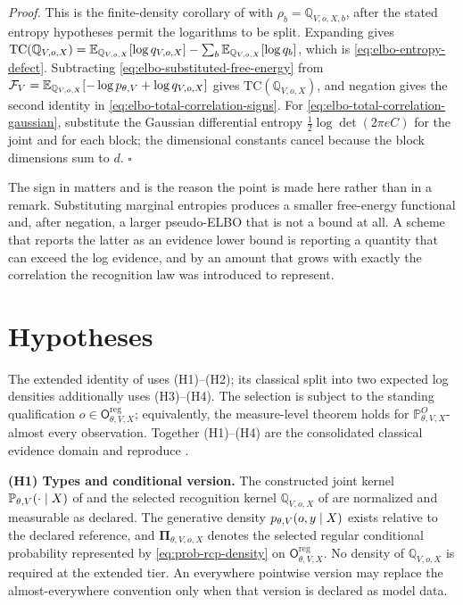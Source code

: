 \emph{Proof.} This is the finite-density corollary of  with $\rho_b=\mathbb Q_{V,o,X,b}$, after the stated entropy hypotheses permit the logarithms to be split. Expanding gives \(\mathrm{TC}(\mathbb Q_{V,o,X})=\mathbb E_{\mathbb Q_{V,o,X}}[\log q_{V,o,X}]-\sum_b\mathbb E_{\mathbb Q_{V,o,X}}[\log q_b]\), which is \eqref{eq:elbo-entropy-defect}. Subtracting \eqref{eq:elbo-substituted-free-energy} from \(\mathcal F_V=\mathbb E_{\mathbb Q_{V,o,X}}[-\log p_{\theta,V}+\log q_{V,o,X}]\) gives \(\mathrm{TC}(\mathbb Q_{V,o,X})\), and negation gives the second identity in \eqref{eq:elbo-total-correlation-signs}. For \eqref{eq:elbo-total-correlation-gaussian}, substitute the Gaussian differential entropy \(\tfrac12\log\det(2\pi e C)\) for the joint and for each block; the dimensional constants cancel because the block dimensions sum to \(d\). \hfill\(\square\)

The sign in  matters and is the reason the point is made here rather than in a remark. Substituting marginal entropies produces a smaller free-energy functional and, after negation, a larger pseudo-ELBO that is not a bound at all. A scheme that reports the latter as an evidence lower bound is reporting a quantity that can exceed the log evidence, and by an amount that grows with exactly the correlation the recognition law was introduced to represent.

\section{Hypotheses}
\label{sec:elbo-hypotheses}

The extended identity of  uses (H1)--(H2); its classical split into two expected log densities additionally uses (H3)--(H4). The selection is subject to the standing qualification \(o\in\mathsf O_{\theta,V,X}^{\mathrm{reg}}\); equivalently, the measure-level theorem holds for \(\mathbb P_{\theta,V,X}^{O}\)-almost every observation. Together (H1)--(H4) are the consolidated classical evidence domain and reproduce . 

\textbf{(H1) Types and conditional version.} The constructed joint kernel \(\mathbb P_{\theta,V}(\cdot\mid X)\) of  and the selected recognition kernel \(\mathbb Q_{V,o,X}\) of  are normalized and measurable as declared. The generative density \(p_{\theta,V}(o,y\mid X)\) exists relative to the declared reference, and \(\boldsymbol\Pi_{\theta,V,o,X}\) denotes the selected regular conditional probability represented by \eqref{eq:prob-rcp-density} on \(\mathsf O_{\theta,V,X}^{\mathrm{reg}}\). No density of \(\mathbb Q_{V,o,X}\) is required at the extended tier. An everywhere pointwise version may replace the almost-everywhere convention only when that version is declared as model data.

